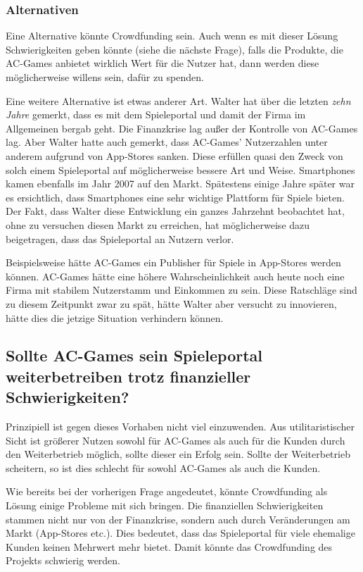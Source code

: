 \subsubsection*{Alternativen}

Eine Alternative könnte Crowdfunding sein. 
Auch wenn es mit dieser Lösung Schwierigkeiten geben könnte (siehe die nächste Frage),
falls die Produkte, die AC-Games anbietet wirklich Wert für die Nutzer hat, dann werden diese möglicherweise willens sein, dafür zu spenden.

Eine weitere Alternative ist etwas anderer Art.
Walter hat über die letzten \emph{zehn Jahre} gemerkt, dass es mit dem Spieleportal und damit der Firma im Allgemeinen bergab geht.
Die Finanzkrise lag außer der Kontrolle von AC-Games lag. Aber Walter hatte auch gemerkt, 
dass AC-Games' Nutzerzahlen unter anderem aufgrund von App-Stores sanken. 
Diese erfüllen quasi den Zweck von solch einem Spieleportal auf möglicherweise bessere Art und Weise.
Smartphones kamen ebenfalls im Jahr 2007 auf den Markt.
Spätestens einige Jahre später war es ersichtlich, dass Smartphones eine sehr wichtige Plattform für Spiele bieten.
Der Fakt, dass Walter diese Entwicklung ein ganzes Jahrzehnt beobachtet hat, ohne zu versuchen diesen Markt zu erreichen, 
hat möglicherweise dazu beigetragen, dass das Spieleportal an Nutzern verlor.

Beispielsweise hätte AC-Games ein Publisher für Spiele in App-Stores werden können.
AC-Games hätte eine höhere Wahrscheinlichkeit auch heute noch eine Firma mit stabilem Nutzerstamm und Einkommen zu sein.
Diese Ratschläge sind zu diesem Zeitpunkt zwar zu spät, hätte Walter aber versucht zu innovieren, hätte dies die jetzige Situation verhindern können.

\subsection*{Sollte AC-Games sein Spieleportal weiterbetreiben trotz finanzieller Schwierigkeiten? \cite{kees_faites_2017}}

Prinzipiell ist gegen dieses Vorhaben nicht viel einzuwenden.
Aus utilitaristischer Sicht ist größerer Nutzen sowohl für AC-Games als auch für die Kunden durch den Weiterbetrieb möglich, sollte dieser ein Erfolg sein.
Sollte der Weiterbetrieb scheitern, so ist dies schlecht für sowohl AC-Games als auch die Kunden.

Wie bereits bei der vorherigen Frage angedeutet, könnte Crowdfunding als Lösung einige Probleme mit sich bringen.
Die finanziellen Schwierigkeiten stammen nicht nur von der Finanzkrise, sondern auch durch Veränderungen am Markt (App-Stores etc.).
Dies bedeutet, dass das Spieleportal für viele ehemalige Kunden keinen Mehrwert mehr bietet.
Damit könnte das Crowdfunding des Projekts schwierig werden. 

